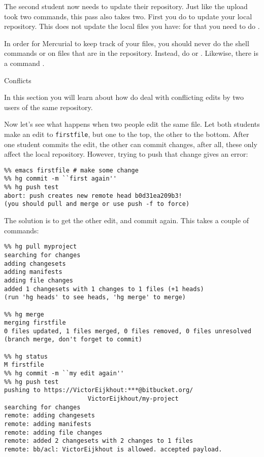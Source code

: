 The second student now needs to update their repository. Just like
the upload took two commands, this pass also takes two. First you do  to update your local repository. This does not update the local files you have: for that you need to do .



In order for Mercurial to keep track of your files, you should never do
the shell commands
 or  on files that are in the repository. Instead, do
 or . Likewise, there is a command .

 {Conflicts}

\begin{purpose}
  In this section you will learn about how do deal with conflicting
  edits by two users of the same repository.
\end{purpose}

Now let's see what happens when two people edit the same file.
Let both students make an edit to \verb+firstfile+, but one to the
top, the other to the bottom. After one student commits the edit, the
other can commit changes, after all, these only affect the local repository.
However, trying to push that change gives an error:
\begin{verbatim}
%% emacs firstfile # make some change
%% hg commit -m ``first again''
%% hg push test
abort: push creates new remote head b0d31ea209b3!
(you should pull and merge or use push -f to force)
\end{verbatim}
The solution is to get the other edit, and commit again. This takes a 
couple of commands:
{\small
\begin{verbatim}
%% hg pull myproject
searching for changes
adding changesets
adding manifests
adding file changes
added 1 changesets with 1 changes to 1 files (+1 heads)
(run 'hg heads' to see heads, 'hg merge' to merge)

%% hg merge
merging firstfile
0 files updated, 1 files merged, 0 files removed, 0 files unresolved
(branch merge, don't forget to commit)

%% hg status
M firstfile
%% hg commit -m ``my edit again''
%% hg push test
pushing to https://VictorEijkhout:***@bitbucket.org/
                       VictorEijkhout/my-project
searching for changes
remote: adding changesets
remote: adding manifests
remote: adding file changes
remote: added 2 changesets with 2 changes to 1 files
remote: bb/acl: VictorEijkhout is allowed. accepted payload.
\end{verbatim}
}

